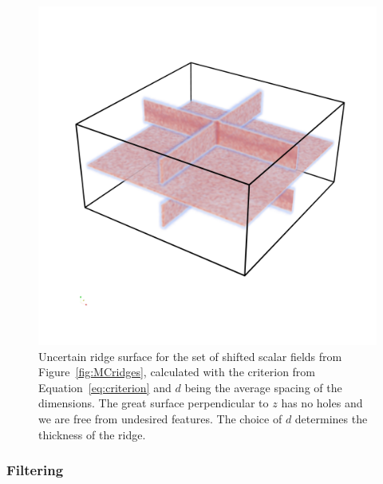 \begin{figure}
    \centering
    \includegraphics[width=\textwidth]{Images/lowuncnew.png}
    \caption{Uncertain ridge surface for the set of shifted scalar
    fields from Figure~\ref{fig:MCridges}, calculated with the criterion
    from Equation~\ref{eq:criterion} and $d$ being the average spacing
    of the dimensions. The great surface perpendicular to $z$ has no
    holes and we are free from undesired features. The choice of $d$
    determines the thickness of the ridge.}
    \label{fig:newmethod}
\end{figure}

\subsubsection{Filtering}

